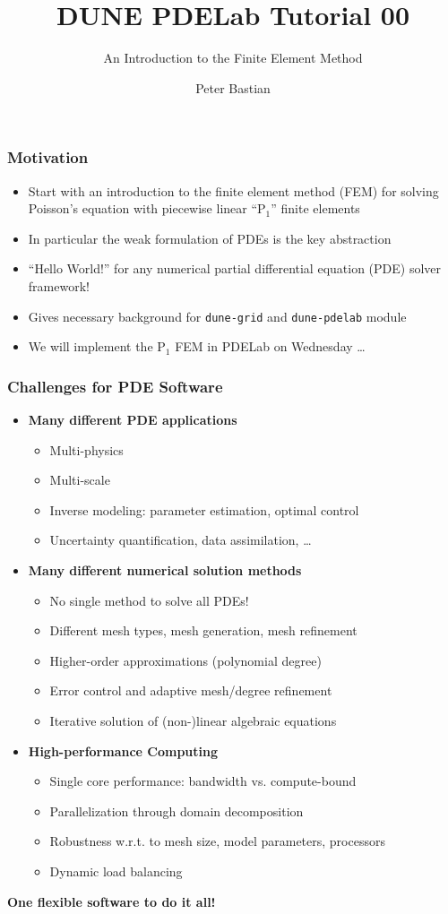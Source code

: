 \documentclass[aspectratio=169,11pt]{beamer}
\title{DUNE PDELab Tutorial 00}
\subtitle{An Introduction to the Finite Element Method}
\author{Peter Bastian}
\institute[]
{
 IWR\\
 Heidelberg University
}
\theoremstyle{definition}
\begin{document}


\begin{frame}
\frametitle{Motivation}
\begin{itemize}
\item Start with an introduction to the finite element method (FEM) for solving Poisson's equation
with piecewise linear ``P$_1$'' finite elements
\item In particular the weak formulation of PDEs is the key abstraction
\item ``Hello World!'' for any numerical partial differential equation (PDE) solver framework!
\item Gives necessary background for \lstinline{dune-grid} and \lstinline{dune-pdelab} module
\item We will implement the P$_1$ FEM in PDELab on Wednesday \ldots
\end{itemize}
\end{frame}

\begin{frame}
\frametitle{Challenges for PDE Software}
\begin{itemize}
\item \textbf{Many different PDE applications}
\begin{itemize}
\item Multi-physics
\item Multi-scale
\item Inverse modeling: parameter estimation, optimal control
\item Uncertainty quantification, data assimilation, \ldots
\end{itemize}
\item \textbf{Many different numerical solution methods}
\begin{itemize}
\item No single method to solve all PDEs!
\item Different mesh types,  mesh generation, mesh refinement
\item Higher-order approximations (polynomial degree)
\item Error control and adaptive mesh/degree refinement
\item Iterative solution of (non-)linear algebraic equations
\end{itemize}
\item \textbf{High-performance Computing}
\begin{itemize}
\item Single core performance: bandwidth vs. compute-bound
\item Parallelization through domain decomposition
\item Robustness w.r.t. to mesh size, model parameters,  processors
\item Dynamic load balancing
\end{itemize}
\end{itemize}
\rightarrownice \textbf{One flexible software to do it all!}
\end{frame}
\end{document}
